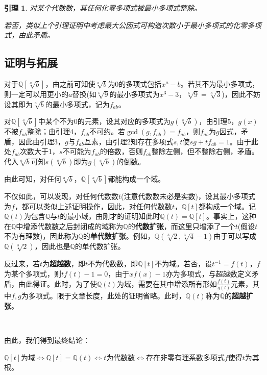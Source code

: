 \documentclass[UTF8]{ctexart}
\newtheorem{lem}{引理}
\begin{document}
\begin{lem} 对某个代数数，其任何化零多项式被最小多项式整除。
	
若否，类似上个引理证明中考虑最大公因式可构造次数小于最小多项式的化零多项式，由此矛盾。
\end{lem}

\subsection{证明与拓展}
对于$\mathbb{Q}[\sqrt[a]{b}]$，由之前可知使$\sqrt[a]{b}$为0的多项式包括$x^a-b$。若其不为最小多项式，则一定可以用更小的$a$替换(如$\sqrt[6]{9}$的最小多项式为$x^3-3$，$\sqrt[6]{9}=\sqrt[3]{3}$)，因此不妨设其即为$\sqrt[a]{b}$的最小多项式，记为$f_{ab}$。

对$\mathbb{Q}[\sqrt[a]{b}]$中某个不为0的元素，设其对应的多项式为$g(\sqrt[a]{b})$，由引理5，$g(x)$不被$f_{ab}$整除；由引理4，$f_{ab}$不可约。若$\gcd(g,f_{ab})=f_{ab}$，则$f_{ab}$为$g$因式，矛盾，因此由引理3，$g$与$f_{ab}$互素，由引理2知存在多项式$s,t$使$sg+tf_{ab}=1$。由于此处$f_{ab}$次数大于1，$s$不可能为$f_{ab}$的倍数，否则$f_{ab}$整除左侧，但不整除右侧，矛盾。代入$\sqrt[a]{b}$可知$s(\sqrt[a]{b})$即为$g(\sqrt[a]{b})$的倒数。

由此可知，对任何$\sqrt[a]{b}$，$\mathbb{Q}[\sqrt[a]{b}]$都能构成一个域。

不仅如此，可以发现，对任何代数数$t$(注意代数数未必是实数)，设其最小多项式为$f$，都可以类似上述证明操作，因此，对任何代数数$t$，$\mathbb{Q}[t]$都构成一个域。记$\mathbb{Q}(t)$为包含$\mathbb{Q}$与$t$的最小域，由刚才的证明知此时$\mathbb{Q}(t)=\mathbb{Q}[t]$。事实上，这种在$\mathbb{Q}$中增添代数数之后封闭成的域称为$\mathbb{Q}$的\textbf{代数扩张}，而这里只增添了一个$t$(假设$t$不为有理数)，因此称为$\mathbb{Q}$的\textbf{单代数扩张}。例如，$\mathbb{Q}(\sqrt[3]{2},\sqrt[3]{4}-1)$由于可以写成$\mathbb{Q}(\sqrt[3]{2})$，因此也是$\mathbb{Q}$的单代数扩张。

反过来，若$t$为\textbf{超越数}，即$t$不为代数数，即$\mathbb{Q}[t]$不为域。若否，设$t^{-1}=f(t)$，$f$为某个多项式，则$tf(t)-1=0$，由于$xf(x)-1$亦为多项式，与超越数定义矛盾，由此得证。此时，为了使$\mathbb{Q}(t)$为域，需要在其中增添所有形如$\frac{f(t)}{g(t)}$元素，其中$f,g$为多项式。限于文章长度，此处的证明省略。此时，$\mathbb{Q}(t)$称为$\mathbb{Q}$的\textbf{超越扩张}。

~

由此，我们得到最终结论：

$\mathbb{Q}[t]$为域$\Leftrightarrow\mathbb{Q}[t]=\mathbb{Q}(t)\Leftrightarrow t$为代数数$\Leftrightarrow$存在非零有理系数多项式$f$使得$t$为其根。
\end{document}
